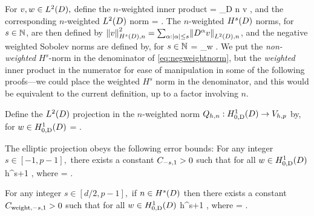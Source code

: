For $v,w \in \LtD,$ define the $n$-weighted inner product
\beqs
{} = \int_{D} n v \wbar,
\eeqs
and the corresponding $n$-weighted $\LtD$ norm
\beqs
{} = .
\eeqs
The $n$-weighted $\HsD$ norms, for $s \in \mathbb N$, are then defined by $\NHsDn{v}^2 = \sum_{\alpha \st \abs{\alpha} \leq s}\NLtDn{D^\alpha v}$, and the negative weighted Sobolev norms are defined by, for $s \in \mathbb N$
\beq\label{eq:negweightnorm}
 = \sup_{w \in \HsD} .
\eeq
We put the \emph{non-weighted} $H^s$-norm in the denominator of \cref{eq:negweightnorm}, but the \emph{weighted} inner product in the numerator for ease of manipulation in some of the following proofs---we could place the weighted $H^s$ norm in the denominator, and this would be equivalent to the current definition, up to a factor involving $n$.

Define the $\LtD$ projection in the $n$-weighted norm $\Qhn:\HozDD\rightarrow \Vhp$ by, for $w \in \HozDD$
\beqs
{} =  \tforall \vh \in \Vhp.
\eeqs


The elliptic projection obeys the following error bounds:
\label{lem:ellprojerr}
For any integer $s \in [-1,p-1],$ there exists a constant $C_{-s,1} >0$ such that for all $w \in \HozDD$
\beq\label{eq:ellprojerr}
 \leq \Cmso h^{s+1} ,
\eeq
where
\beqs
\Cmso = \CSZs.
\eeqs
\ele

\label{lem:ellprojerrw}
For any integer $s \in [d/2,p-1],$ if $n \in \HsD$ then there exists a constant $C_{\mathrm{weight},-s,1} >0$ such that for all $w \in \HozDD$
\beq\label{eq:ellprojerr}
 \leq \Cwmso h^{s+1} ,
\eeq
where
\beqs
\Cmso = \CSZs.
\eeqs
\ele

